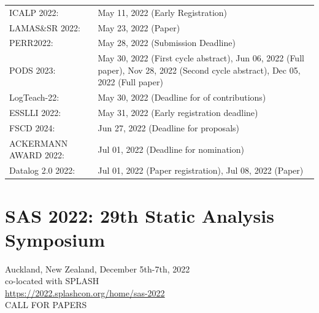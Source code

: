 \documentclass[prodmode,acmtecs]{acmsmall} %
\begin{document}
\begin{tabulary}{\linewidth}{LL}
ICALP 2022:  & May 11, 2022 (Early Registration) \\
LAMAS\&SR 2022:  & May 23, 2022 (Paper) \\
PERR2022:  & May 28, 2022 (Submission Deadline) \\
PODS 2023:  & May 30, 2022 (First cycle abstract), Jun 06, 2022 (Full paper), Nov 28, 2022 (Second cycle abstract), Dec 05, 2022 (Full paper) \\
LogTeach-22:  & May 30, 2022 (Deadline for  of contributions) \\
ESSLLI 2022:  & May 31, 2022 (Early registration deadline) \\
FSCD 2024:  & Jun 27, 2022 (Deadline for proposals) \\
ACKERMANN AWARD 2022:  & Jul 01, 2022 (Deadline for nomination) \\
Datalog 2.0 2022:  & Jul 01, 2022 (Paper registration), Jul 08, 2022 (Paper) \\
\end{tabulary}
\section{SAS 2022: 29th Static Analysis Symposium}\label{SAS2022}  Auckland, New Zealand, December 5th-7th, 2022\\ 
  co-located with SPLASH\\ 
  \href{https://2022.splashcon.org/home/sas-2022}{https://2022.splashcon.org/home/sas-2022}\\ 
CALL FOR PAPERS 
\end{document}
